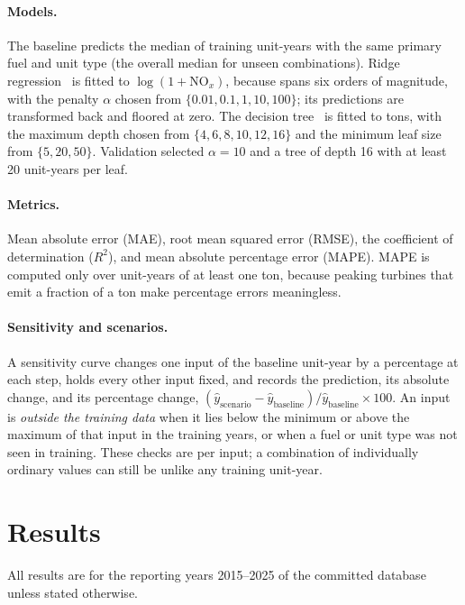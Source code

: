 \documentclass[11pt,a4paper]{article}
\begin{document}
\paragraph{Models.} The baseline predicts the median \NOx{} of training unit-years with the same
primary fuel and unit type (the overall median for unseen combinations). Ridge
regression~\cite{hoerl1970ridge} is fitted to $\log(1 + \text{NO}_x)$, because \NOx{} spans six
orders of magnitude, with the penalty $\alpha$ chosen from $\{0.01, 0.1, 1, 10, 100\}$; its
predictions are transformed back and floored at zero. The decision tree~\cite{breiman1984cart}
is fitted to tons, with the maximum depth chosen from $\{4, 6, 8, 10, 12, 16\}$ and the minimum
leaf size from $\{5, 20, 50\}$. Validation selected $\alpha = 10$ and a tree of depth 16 with at
least 20 unit-years per leaf.

\paragraph{Metrics.} Mean absolute error (MAE), root mean squared error (RMSE), the coefficient of
determination ($R^2$), and mean absolute percentage error (MAPE). MAPE is computed only over
unit-years of at least one ton, because peaking turbines that emit a fraction of a ton make
percentage errors meaningless.

\paragraph{Sensitivity and scenarios.} A sensitivity curve changes one input of the baseline
unit-year by a percentage at each step, holds every other input fixed, and records the
prediction, its absolute change, and its percentage change, $(\hat{y}_{\text{scenario}} -
\hat{y}_{\text{baseline}}) / \hat{y}_{\text{baseline}} \times 100$. An input is \emph{outside the
training data} when it lies below the minimum or above the maximum of that input in the training
years, or when a fuel or unit type was not seen in training. These checks are per input; a
combination of individually ordinary values can still be unlike any training unit-year.

\section{Results}
\label{sec:results}

All results are for the reporting years 2015--2025 of the committed database unless stated
otherwise.
\end{document}
